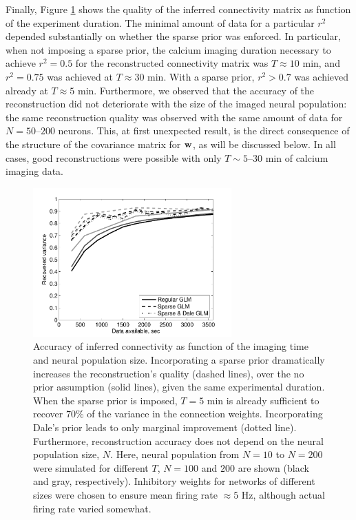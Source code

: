 Finally, Figure \ref{fig:recvar-NT} shows the quality of the inferred connectivity matrix as function of the experiment duration. The minimal amount of data for a particular $r^2$ depended substantially on whether the sparse prior was enforced. In particular, when not imposing a sparse prior, the calcium imaging duration necessary to achieve $r^2=0.5$ for the reconstructed connectivity matrix was $T\approx 10$ min, and $r^2=0.75$ was achieved at $T\approx 30$ min. With a sparse prior, $r^2>0.7$ was achieved already at $T\approx 5$ min. Furthermore, we observed that the accuracy of the reconstruction did not deteriorate with the size of the imaged neural population: the same reconstruction quality was observed with the same amount of data for $N=50$--$200$ neurons.  This, at first unexpected result, is the direct consequence of the structure of the covariance matrix for $\mathbf{w}$, as will be discussed below. In all cases, good reconstructions were possible with only $T\sim 5$--$30$ min of calcium imaging data.

\begin{figure}[h]
\centering
\includegraphics[width=3in]{../figs/FigureA7_recvar_NT}
\caption{Accuracy of inferred connectivity as function of the imaging time and neural population size. Incorporating a sparse prior dramatically increases the reconstruction's quality (dashed lines), over the no prior assumption (solid lines), given the same experimental duration. When the sparse prior is imposed, $T=5$ min is already sufficient to recover $70\%$ of the variance in the connection weights. Incorporating Dale's prior leads to only marginal improvement (dotted line). Furthermore, reconstruction accuracy does not depend on the neural population size, $N$. Here, neural population from $N=10$ to $N=200$ were simulated for different $T$, $N=100$ and $200$ are shown (black and gray, respectively).  Inhibitory weights for networks of different sizes were chosen to ensure mean firing rate $\approx 5$ Hz, although actual firing rate varied somewhat.}
\label{fig:recvar-NT}
\end{figure}

